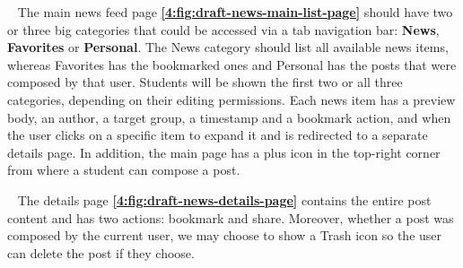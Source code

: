 ~
The main news feed page \textbf{\ref{4:fig:draft-news-main-list-page}} should have two or three big categories that could be accessed via a tab navigation bar: \textbf{News}, \textbf{Favorites} or \textbf{Personal}. The News category should list all available news items, whereas Favorites has the bookmarked ones and Personal has the posts that were composed by that user. Students will be shown the first two or all three categories, depending on their editing permissions. Each news item has a preview body, an author, a target group, a timestamp and a bookmark action, and when the user clicks on a specific item to expand it and is redirected to a separate details page. In addition, the main page has a plus icon in the top-right corner from where a student can compose a post.

~
The details page \textbf{\ref{4:fig:draft-news-details-page}} contains the entire post content and has two actions: bookmark and share. Moreover, whether a post was composed by the current user, we may choose to show a Trash icon so the user can delete the post if they choose.

